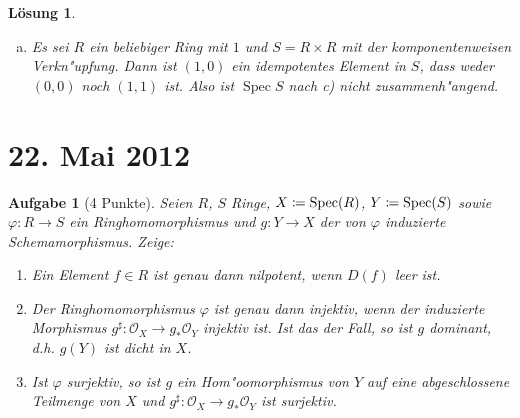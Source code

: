 \documentclass[paper = A4, fontsize=12pt, numbers=noendperiod, chapterprefix=true]{scrbook}
\theoremstyle{break}
\newtheorem{Aufg}{Aufgabe}
\newtheorem{Loes}{L\"osung}
\theoremstyle{nonumberbreak}
\theoremstyle{nonumberplain}
\DeclareMathOperator{\Spec}{Spec}
\begin{document}
\begin{Loes}
\begin{enumerate}[a)]
  Nun sei $\Spec(R)$ nicht zusammenh"angend. Wir finden ein drittes idempotentes Element. Sei $\Spec(R) = V_1 \cup V_2$ eine Zerlegung in abgeschlossene, disjunkte, nichtleere Teilmengen. Es ist $V_1 = V(I_1)$ und $V_2 = V(I_2)$, f"ur Ideale $I_1, I_2 \subseteq R$. Da ihr Durchschnitt $V(I_1) \cap V(I_2) = V(I_1+I_2) = \emptyset = V(1)$ ist, folgt $I_1+I_2 = R$, und es gibt $e_1\in I_1$, $e_2\in I_2$ mit $e_1+e_2 = 1$. Andererseits ist weder $e_1$ noch $e_2$ eine Einheit, denn beide Verschwindungsmengen sind nichtleer. Außerdem ist $V(I_1)\cup V(I_2) = V(I_1\cdot I_2) = \Spec(R) = V(\sqrt{0})$ gleich der Verschwindungsmenge des Nilradikals. Also folgt $I_1\cdot I_2 \subseteq \sqrt{0}$ und damit ist $e_1e_2$ nilpotent.

  \item Es sei $R$ ein beliebiger Ring mit $1$ und $S= R\times R$ mit der komponentenweisen Verkn"upfung. Dann ist $(1,0)$ ein idempotentes Element in $S$, dass weder $(0,0)$ noch $(1,1)$ ist. Also ist $\Spec S$ nach c) nicht zusammenh"angend.
\end{enumerate}\end{Loes}

\newpage
\section{22. Mai 2012}
\setcounter{Aufg}{0}
\setcounter{Loes}{0}

\begin{Aufg}[4 Punkte]
 Seien $R$, $S$ Ringe, $X\coloneqq\textup{Spec}(R)$, $Y\coloneqq\textup{Spec}(S)$ sowie $\varphi \colon R \to S$ ein Ringhomomorphismus und $g \colon Y \to X$ der von $\varphi$ induzierte Schemamorphismus. Zeige:
\begin{enumerate}%
\item Ein Element $f \in R$ ist genau dann nilpotent, wenn $D(f)$ leer ist.
\item Der Ringhomomorphismus $\varphi$ ist genau dann injektiv, wenn der induzierte Morphismus $g^\sharp \colon \mathcal{O}_X \to g_* \mathcal{O}_Y$ injektiv ist. Ist das der Fall, so ist $g$ dominant, d.h. $g(Y)$ ist dicht in $X$.
\item Ist $\varphi$ surjektiv, so ist $g$ ein Hom"oomorphismus von $Y$ auf eine abgeschlossene Teilmenge von $X$ und $g^\sharp \colon \mathcal{O}_X \rightarrow g_* \mathcal{O}_Y$ ist surjektiv.
\end{enumerate}
\end{Aufg}
\end{document}
